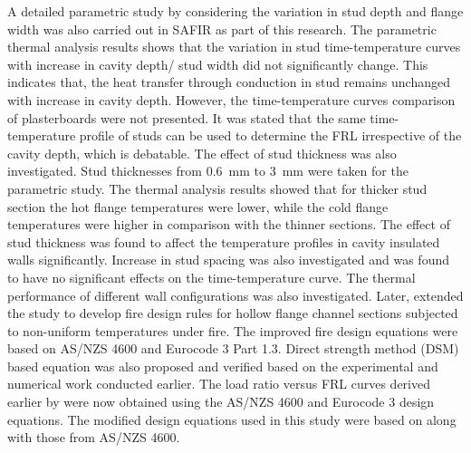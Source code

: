 A detailed parametric study by considering the variation in stud depth and flange width was also carried out in SAFIR as part of this research. The parametric thermal analysis results shows that the variation in stud time-temperature curves with increase in cavity depth/ stud width did not significantly change. This indicates that, the heat transfer through conduction in stud remains unchanged with increase in cavity depth. However, the time-temperature curves comparison of plasterboards were not presented. It was stated that the same time-temperature profile of studs can be used to determine the FRL irrespective of the cavity depth, which is debatable. The effect of stud thickness was also investigated. Stud thicknesses from 0.6~mm to 3~mm were taken for the parametric study. The thermal analysis results showed that for thicker stud section the hot flange temperatures were lower, while the cold flange temperatures were higher in comparison with the thinner sections. The effect of stud thickness was found to affect the temperature profiles in cavity insulated walls significantly. Increase in stud spacing was also investigated and was found to have no significant effects on the time-temperature curve. The thermal performance of different wall configurations was also investigated. Later, \citet{Kesawan2016} extended the study to develop fire design rules for hollow flange channel sections subjected to non-uniform temperatures under fire. The improved fire design equations were based on AS/NZS 4600 and Eurocode 3 Part 1.3. Direct strength method (DSM) based equation was also proposed and verified based on the experimental and numerical work conducted earlier. The load ratio versus FRL curves derived earlier by \citet{Kesawan2015a} were now obtained using the AS/NZS 4600 and Eurocode 3 design equations. The modified design equations used in this study were based on \citet{Gunalan2013a} along with those from AS/NZS 4600.  

